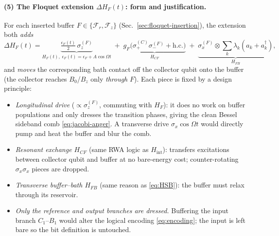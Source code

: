 \documentclass[11pt,a4paper]{article}
\theoremstyle{definition}
\theoremstyle{remark}
\begin{document}
\paragraph{(5) The Floquet extension $\Delta H_F(t)$: form and
justification.}
For each inserted buffer $F\in\{\mathcal{F}_r,\mathcal{F}_z\}$
(Sec.~\ref{sec:floquet-insertion}), the extension both \emph{adds}
\begin{equation}
\Delta H_F(t)=
\underbrace{\tfrac{\epsilon_F(t)}{2}\,\sigma_z^{(F)}}_{H_F(t),\;
\epsilon_F(t)=\epsilon_F+A\cos\Omega t}
\;+\;\underbrace{g_F\big(\sigma_+^{(C)}\sigma_-^{(F)}+\mathrm{h.c.}\big)}_{H_{CF}}
\;+\;\underbrace{\sigma_x^{(F)}\!\otimes\!\sum_k\lambda_k(a_k+a_k^\dagger)}_{H_{FB}},
\end{equation}
and \emph{moves} the corresponding bath contact off the collector qubit
onto the buffer (the collector reaches $B_0$/$B_z$ only \emph{through}
$F$). Each piece is fixed by a design principle:
\begin{itemize}
\item \emph{Longitudinal drive} ($\propto\sigma_z^{(F)}$, commuting with
$H_F$): it does no work on buffer populations and only dresses the
transition phases, giving the clean Bessel sideband comb
\eqref{eq:jacobi-anger}. A transverse drive $\sigma_x\cos\Omega t$ would
directly pump and heat the buffer and blur the comb.
\item \emph{Resonant exchange $H_{CF}$} (same RWA logic as
$H_{\mathrm{int}}$): transfers excitations between collector qubit and
buffer at no bare-energy cost; counter-rotating $\sigma_x\sigma_x$
pieces are dropped.
\item \emph{Transverse buffer--bath $H_{FB}$} (same reason as
\eqref{eq:HSB}): the buffer must relax through its reservoir.
\item \emph{Only the reference and output branches are dressed.}
Buffering the input branch $C_1$--$B_1$ would alter the logical encoding
\eqref{eq:encoding}; the input is left bare so the bit definition is
untouched.
\end{itemize}
\end{document}
